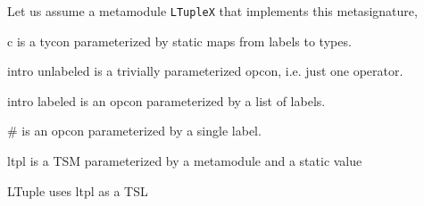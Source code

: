 Let us assume a metamodule \lstinline{LTupleX} that implements this metasignature,

c is a tycon parameterized by static maps from labels to types. 

intro unlabeled is a trivially parameterized opcon, i.e. just one operator.

intro labeled is an opcon parameterized by a list of labels.

\# is an opcon parameterized by a single label.

ltpl is a TSM parameterized by a metamodule and a static value

LTuple uses ltpl as a TSL

\begin{lstlisting}
\end{lstlisting}



